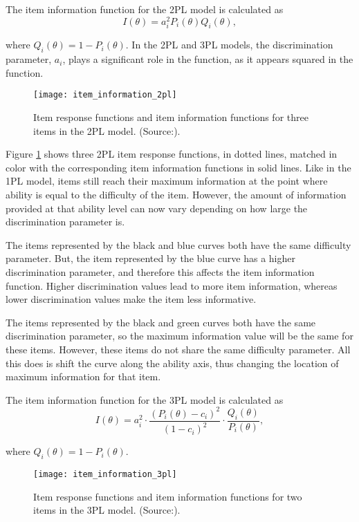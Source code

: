 The item information function for the 2PL model is calculated as
$$I(\theta) = a_i^2 P_i(\theta)Q_i(\theta),$$

where $Q_i(\theta) = 1-P_i(\theta)$. In the 2PL and 3PL models, the discrimination parameter, $a_i$, plays a significant role in the function, as it appears squared in the function.

\begin{figure}[H]
\centering
\texttt{[image: item\_information\_2pl]}
\caption{Item response functions and item information
functions for three items in the 2PL model. (Source:\cite{Visual-IRT}).}
\label{fig:item_information_2pl}
\end{figure}

Figure \ref{fig:item_information_2pl} shows three 2PL item response functions, in dotted lines, matched in color with the corresponding item information functions in solid lines. Like in the 1PL model, items still reach their maximum information at the point where ability is equal to the difficulty of the item. However, the amount of information provided at that ability level can now vary depending on how large the discrimination parameter is.\newline

The items represented by the black and blue curves both have the same difficulty parameter. But, the item represented by the blue curve has a higher discrimination parameter, and therefore this affects the item information function. Higher discrimination values lead to more item information, whereas lower discrimination values make the item less informative. \newline

The items represented by the black and green curves both have the same discrimination parameter, so the maximum information value will be the same for these items. However, these items do not share the same difficulty parameter. All this does is shift the curve along the ability axis, thus changing the location of maximum information for that item.\newline

The item information function for the 3PL model is calculated as
$$I(\theta) = a_i^2 \cdot \dfrac{(P_i(\theta)-c_i)^2}{(1-c_i)^2} \cdot \dfrac{Q_i(\theta)}{P_i(\theta)},$$

where $Q_i(\theta) = 1-P_i(\theta)$.

\begin{figure}[H]
\centering
\texttt{[image: item\_information\_3pl]}
\caption{Item response functions and item information
functions for two items in the 3PL model. (Source:\cite{Visual-IRT}).}
\label{fig:item_information_3pl}
\end{figure}

